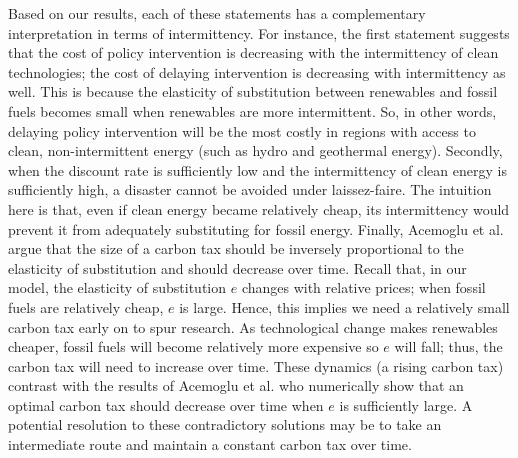 \documentclass[11pt,a4paper]{extarticle}
\begin{document}
Based on our results, each of these statements has a complementary interpretation in terms of intermittency. For instance, the first statement suggests that the cost of policy intervention is decreasing with the intermittency of clean technologies; the cost of delaying intervention is decreasing with intermittency as well. This is because the elasticity of substitution between renewables and fossil fuels becomes small when renewables are more intermittent.  So, in other words, delaying policy intervention will be the most costly in regions with access to clean, non-intermittent energy (such as hydro and geothermal energy). Secondly,  when the discount rate is sufficiently low and the intermittency of clean energy is sufficiently high, a disaster cannot be avoided under laissez-faire. The intuition here is that, even if clean energy became relatively cheap, its intermittency would prevent it from adequately substituting for fossil energy. Finally, Acemoglu et al. argue that the size of a carbon tax should be inversely proportional to the elasticity of substitution and should decrease over time. Recall that, in our model, the elasticity of substitution $e$ changes with relative prices; when fossil fuels are relatively cheap, $e$ is large. Hence, this implies we need a relatively small carbon tax early on to spur research. As technological change makes renewables cheaper, fossil fuels will become relatively more expensive so $e$ will fall; thus, the carbon tax will need to increase over time. These dynamics (a rising carbon tax) contrast with the results of Acemoglu et al. who numerically show that an optimal carbon tax should decrease over time when $e$ is sufficiently large. A potential resolution to these contradictory solutions may be to take an intermediate route and maintain a constant carbon tax over time. 
\end{document}
